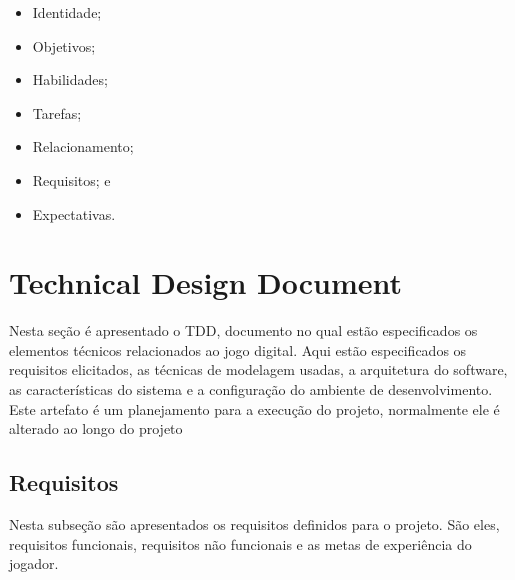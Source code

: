 \begin{itemize}
    \item Identidade;
    \item Objetivos;
    \item Habilidades;
    \item Tarefas;
    \item Relacionamento;
    \item Requisitos; e
    \item Expectativas.
\end{itemize}




\section{Technical Design Document}
\label{sec:tdd}
Nesta seção é apresentado o TDD, documento no qual estão especificados os elementos técnicos relacionados ao jogo digital. Aqui estão especificados os requisitos elicitados, as técnicas de modelagem usadas, a arquitetura do software, as características do sistema e a configuração do ambiente de desenvolvimento. Este artefato é um planejamento para a execução do projeto, normalmente ele é alterado ao longo do projeto

\subsection{Requisitos}

Nesta subseção são apresentados os requisitos definidos para o projeto. São eles, requisitos funcionais, requisitos não funcionais e as metas de experiência do jogador. 


